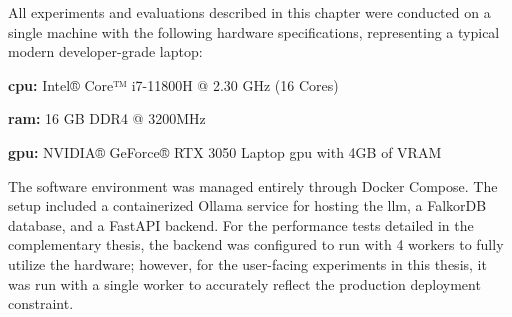 All experiments and evaluations described in this chapter were conducted on a single machine with the following hardware specifications, representing a typical modern developer-grade laptop:

\begin{compactitem}[\textbullet]
    \item \textbf{\acs{cpu}:} Intel® Core™ i7-11800H @ 2.30 GHz (16 Cores)
    \item \textbf{\acs{ram}:} 16 GB DDR4 @ 3200MHz
    \item \textbf{\acs{gpu}:} NVIDIA® GeForce® RTX 3050 Laptop \acs{gpu} with 4GB of VRAM
\end{compactitem}

The software environment was managed entirely through Docker Compose. The setup included a containerized Ollama service for hosting the \ac{llm}, a FalkorDB database, and a FastAPI backend. For the performance tests detailed in the complementary thesis, the backend was configured to run with 4 workers to fully utilize the hardware; however, for the user-facing experiments in this thesis, it was run with a single worker to accurately reflect the production deployment constraint.